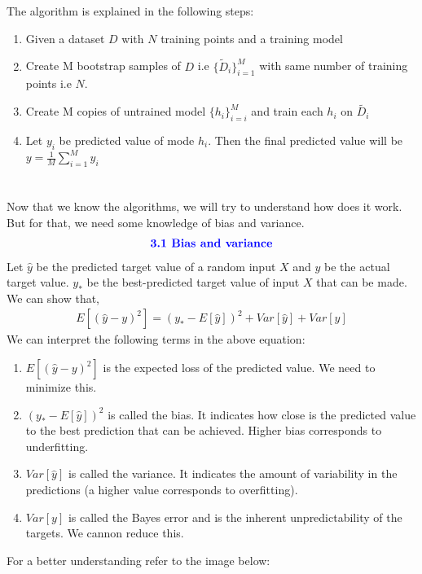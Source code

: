 \documentclass{homework}
\begin{document}
\section{}
The algorithm is explained in the following steps:
\begin{enumerate}
    \item Given a dataset $D$ with $N$ training points and a training model
    \item Create M bootstrap samples of $D$ i.e $\{\tilde{D}_{i}\}_{i=1}^{M}$ with same number of training points i.e $N$.
    \item Create M copies of untrained model $\{h_i\}_{i=i}^{M}$ and train each $h_i$ on $\tilde{D_i}$
    \item Let $y_i$ be predicted value of mode $h_i$. Then the final predicted value will be $y = \frac{1}{M}\sum_{i=1}^{M}y_i$ 
\end{enumerate}



\section{}
Now that we know the algorithms, we will try to understand how does it work. But for that, we need some knowledge of bias and variance.
\begin{align*}
   \textcolor{blue}{ \text{{\textbf{3.1 Bias and variance}}}}
\end{align*}
Let $\hat{y}$ be the predicted target value of a random input $X$ and $y$ be the actual target value. $y_*$ be the best-predicted target value of input $X$ that can be made. We can show that,
\begin{align*}
    E[(\hat{y} - y)^2] = (y_* - E[\hat{y}])^2 + Var[\hat{y}] + Var[y]
\end{align*}
We can interpret the following terms in the above equation:
\begin{enumerate}
    \item $E[(\hat{y} - y)^2]$ is the expected loss of the predicted value. We need to minimize this.
    \item $(y_* - E[\hat{y}])^2$ is called the bias. It indicates how close is the predicted value to the best prediction that can be achieved. Higher bias corresponds to underfitting.
    \item $Var[\hat{y}]$ is called the variance. It indicates the amount of variability in the predictions (a higher value corresponds to overfitting).
    \item $Var[y]$ is called the Bayes error and is the inherent unpredictability of the targets. We cannon reduce this.
\end{enumerate}
For a better understanding refer to the image below:
\end{document}
